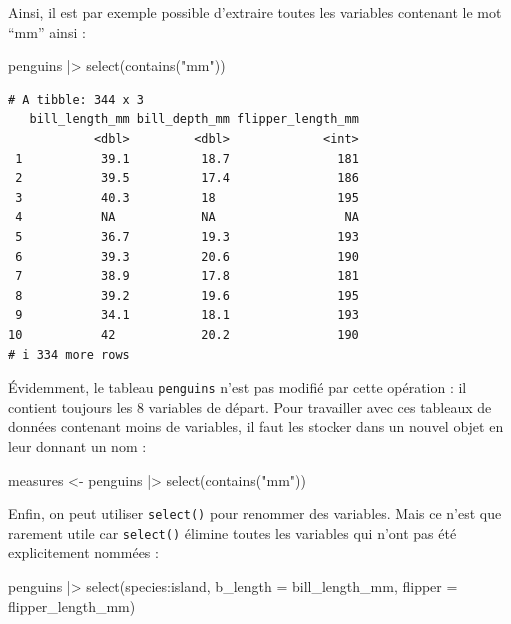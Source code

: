 \documentclass[
  a4paper,
  DIV=11,
  numbers=noendperiod,
  oneside]{scrreprt}
\newenvironment{Shaded}{}{}
\newcommand{\AttributeTok}[1]{\textcolor[rgb]{0.84,0.23,0.29}{#1}}
\newcommand{\FunctionTok}[1]{\textcolor[rgb]{0.44,0.26,0.76}{#1}}
\newcommand{\NormalTok}[1]{\textcolor[rgb]{0.14,0.16,0.18}{#1}}
\newcommand{\OtherTok}[1]{\textcolor[rgb]{0.44,0.26,0.76}{#1}}
\newcommand{\SpecialCharTok}[1]{\textcolor[rgb]{0.00,0.36,0.77}{#1}}
\newcommand{\StringTok}[1]{\textcolor[rgb]{0.01,0.18,0.38}{#1}}
\begin{document}
Ainsi, il est par exemple possible d'extraire toutes les variables
contenant le mot ``mm'' ainsi :

\begin{Shaded}
\begin{Highlighting}[]
\NormalTok{penguins }\SpecialCharTok{|\textgreater{}}
  \FunctionTok{select}\NormalTok{(}\FunctionTok{contains}\NormalTok{(}\StringTok{"mm"}\NormalTok{))}
\end{Highlighting}
\end{Shaded}

\begin{verbatim}
# A tibble: 344 x 3
   bill_length_mm bill_depth_mm flipper_length_mm
            <dbl>         <dbl>             <int>
 1           39.1          18.7               181
 2           39.5          17.4               186
 3           40.3          18                 195
 4           NA            NA                  NA
 5           36.7          19.3               193
 6           39.3          20.6               190
 7           38.9          17.8               181
 8           39.2          19.6               195
 9           34.1          18.1               193
10           42            20.2               190
# i 334 more rows
\end{verbatim}

Évidemment, le tableau \texttt{penguins} n'est pas modifié par cette
opération : il contient toujours les 8 variables de départ. Pour
travailler avec ces tableaux de données contenant moins de variables, il
faut les stocker dans un nouvel objet en leur donnant un nom :

\begin{Shaded}
\begin{Highlighting}[]
\NormalTok{measures }\OtherTok{\textless{}{-}}\NormalTok{ penguins }\SpecialCharTok{|\textgreater{}}
  \FunctionTok{select}\NormalTok{(}\FunctionTok{contains}\NormalTok{(}\StringTok{"mm"}\NormalTok{))}
\end{Highlighting}
\end{Shaded}

Enfin, on peut utiliser \texttt{select()} pour renommer des variables.
Mais ce n'est que rarement utile car \texttt{select()} élimine toutes
les variables qui n'ont pas été explicitement nommées :

\begin{Shaded}
\begin{Highlighting}[]
\NormalTok{penguins }\SpecialCharTok{|\textgreater{}}
  \FunctionTok{select}\NormalTok{(species}\SpecialCharTok{:}\NormalTok{island,}
         \AttributeTok{b\_length =}\NormalTok{ bill\_length\_mm,}
         \AttributeTok{flipper =}\NormalTok{ flipper\_length\_mm)}
\end{Highlighting}
\end{Shaded}
\end{document}
